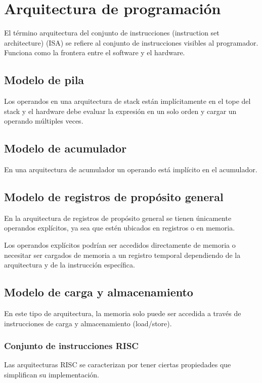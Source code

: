 \chapter{Arquitectura de programación}
El término arquitectura del conjunto de instrucciones (instruction set architecture) (ISA) se refiere al conjunto de instrucciones visibles al programador. Funciona como la frontera entre el software y el hardware.


\section{Modelo de pila}
Los operandos en una arquitectura de stack están implícitamente en el tope del stack y el hardware debe evaluar la expresión en un solo orden y cargar un operando múltiples veces.


\section{Modelo de acumulador}
En una arquitectura de acumulador un operando está implícito en el acumulador.


\section{Modelo de registros de propósito general}
En la arquitectura de registros de propósito general se tienen únicamente operandos explícitos, ya sea que estén ubicados en registros o en memoria.

Los operandos explícitos podrían ser accedidos directamente de memoria o necesitar ser cargados de memoria a un registro temporal dependiendo de la arquitectura y de la instrucción específica.


\section{Modelo de carga y almacenamiento}

En este tipo de arquitectura, la memoria solo puede ser accedida a través de instrucciones de carga y almacenamiento (load/store). 

\subsection{Conjunto de instrucciones RISC}

Las arquitecturas RISC se caracterizan por tener ciertas propiedades que simplifican su implementación.


